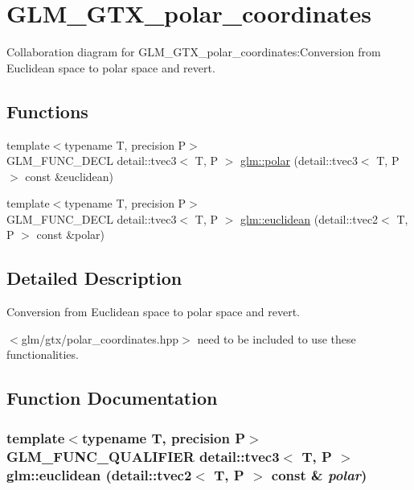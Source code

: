 \hypertarget{group__gtx__polar__coordinates}{
\section{GLM\_\-GTX\_\-polar\_\-coordinates}
\label{group__gtx__polar__coordinates}
}


Collaboration diagram for GLM\_\-GTX\_\-polar\_\-coordinates:Conversion from Euclidean space to polar space and revert.  
\subsection*{Functions}
\begin{CompactItemize}
\item 
{\footnotesize template$<$typename T, precision P$>$ }\\GLM\_\-FUNC\_\-DECL detail::tvec3$<$ T, P $>$ \hyperlink{group__gtx__polar__coordinates_g65a075c52ee1c699d77c4a98dd266006}{glm::polar} (detail::tvec3$<$ T, P $>$ const \&euclidean)
\item 
{\footnotesize template$<$typename T, precision P$>$ }\\GLM\_\-FUNC\_\-DECL detail::tvec3$<$ T, P $>$ \hyperlink{group__gtx__polar__coordinates_g3bd21c0f1b1d99a2f8e9cfc85bca488e}{glm::euclidean} (detail::tvec2$<$ T, P $>$ const \&polar)
\end{CompactItemize}


\subsection{Detailed Description}
Conversion from Euclidean space to polar space and revert. 

$<$glm/gtx/polar\_\-coordinates.hpp$>$ need to be included to use these functionalities. 

\subsection{Function Documentation}
\hypertarget{group__gtx__polar__coordinates_g3bd21c0f1b1d99a2f8e9cfc85bca488e}{
\subsubsection[euclidean]{\setlength{\rightskip}{0pt plus 5cm}template$<$typename T, precision P$>$ GLM\_\-FUNC\_\-QUALIFIER detail::tvec3$<$ T, P $>$ glm::euclidean (detail::tvec2$<$ T, P $>$ const \& {\em polar})}}
\label{group__gtx__polar__coordinates_g3bd21c0f1b1d99a2f8e9cfc85bca488e}


